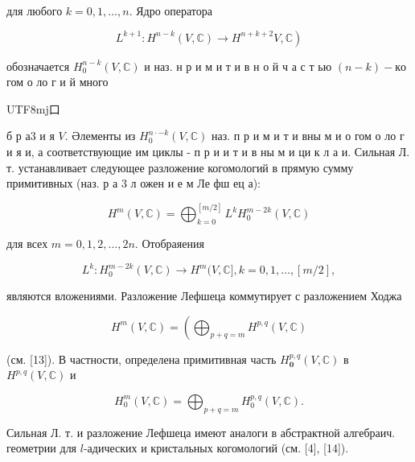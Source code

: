 \documentclass[10pt]{article}
\begin{document}
для любого $k=0,1, \ldots, n$. Ядро оператора



\[

\left.L^{k+1}: H^{n-k}(V, \mathbb{C}) \longrightarrow H^{n+k+2} V, \mathbb{C}\right)

\]



обозначается $H_{0}^{n-k}(V, \mathbb{C})$ и наз. н р и м и т и в н о й ч а с т ью $(n-k)-к о$ гом о ло г и й много\begin{CJK}{UTF8}{mj}口\end{CJK}б р а3 и я $V$. Әлементы из $H_{0}^{n \cdot-k}(V, \mathbb{C})$ наз. п р и м и т и вны м и о гом о ло г и я и, а соответствующие им циклы - п р и и т и в ны м и ци к л а и. Сильная Л. т. устанавливает следующее разложение когомологий в прямую сумму примитивных (наз. р а 3 л ожен и е м Ле фш ец а):



\[

H^{m}(V, \mathbb{C})=\bigoplus_{k=0}^{[m / 2]} L^{k} H_{0}^{m-2 k}(V, \mathbb{C})

\]



для всех $m=0,1,2, \ldots, 2 n$. Отобраяения



\[

L^{k}: H_{0}^{m-2 k}(V, \mathbb{C}) \longrightarrow H^{m}(V, \mathbb{C}], k=0,1, \ldots,[m / 2],

\]



являются вложениями. Разложение Лефшеца коммутирует с разложением Ходжа



\[

H^{m}(V, \mathbb{C})=\left(\bigoplus_{p+q=m} H^{p, q}(V, \mathbb{C})\right.

\]



(см. [13]). В частности, определена примитивная часть $H_{\mathbf{0}}^{p, q}(V, \mathbb{C})$ в $H^{p, q}(V, \mathbb{C})$ и



\[

H_{0}^{m}(V, \mathbb{C})=\bigoplus_{p+q=m} H_{0}^{p, q}(V, \mathbb{C}) .

\]



Сильная Л. т. и разложение Лефшеца имеют аналоги в абстрактной алгебраич. геометрии для $l$-адических и кристальных когомологий (см. [4], [14]).
\end{document}

